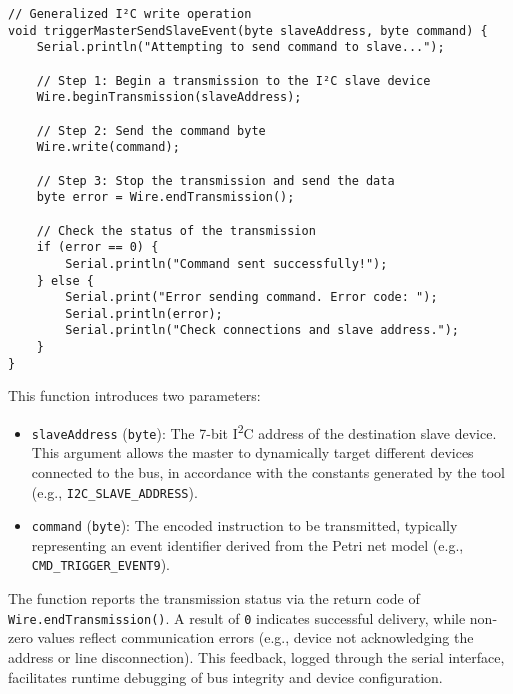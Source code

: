 \begin{verbatim}
// Generalized I²C write operation
void triggerMasterSendSlaveEvent(byte slaveAddress, byte command) {
    Serial.println("Attempting to send command to slave...");

    // Step 1: Begin a transmission to the I²C slave device
    Wire.beginTransmission(slaveAddress);

    // Step 2: Send the command byte
    Wire.write(command);

    // Step 3: Stop the transmission and send the data
    byte error = Wire.endTransmission();

    // Check the status of the transmission
    if (error == 0) {
        Serial.println("Command sent successfully!");
    } else {
        Serial.print("Error sending command. Error code: ");
        Serial.println(error);
        Serial.println("Check connections and slave address.");
    }
}
\end{verbatim}

\noindent
This function introduces two parameters:
\begin{itemize}
    \item \texttt{slaveAddress} (\texttt{byte}): The 7-bit I\textsuperscript{2}C address of the destination slave device. This argument allows the master to dynamically target different devices connected to the bus, in accordance with the constants generated by the tool (e.g., \texttt{I2C\_SLAVE\_ADDRESS}).
    \item \texttt{command} (\texttt{byte}): The encoded instruction to be transmitted, typically representing an event identifier derived from the Petri net model (e.g., \texttt{CMD\_TRIGGER\_EVENT9}).
\end{itemize}

The function reports the transmission status via the return code of \texttt{Wire.endTransmission()}. A result of \texttt{0} indicates successful delivery, while non-zero values reflect communication errors (e.g., device not acknowledging the address or line disconnection). This feedback, logged through the serial interface, facilitates runtime debugging of bus integrity and device configuration.


